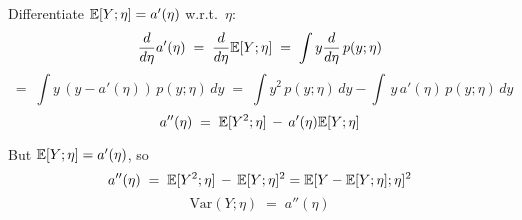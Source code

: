 \begin{answer}

Differentiate $\mathbb{E}[Y;\eta]=a'(\eta)$ w.r.t.\ $\eta$:
\[
\frac{d}{d\eta}a'(\eta)
    \;=\; \frac{d}{d\eta}\mathbb{E}[Y;\eta]
    \;=\; \int y \frac{d}{d\eta} \, p(y;\eta)
\]
\[
    \;=\; \int y\,(y - a'(\eta))\,p(y;\eta)\,dy
    \;=\; \int y^2\,p(y;\eta)\,dy - \int \,y\,a'(\eta)\,p(y;\eta)\,dy\,
\]
\[
   a''(\eta) \;=\; \mathbb{E}[Y^2;\eta] \,-\, a'(\eta)\mathbb{E}[Y;\eta]
\]

But $\mathbb{E}[Y;\eta]=a'(\eta)$, so
\[
   a''(\eta) \;=\; \mathbb{E}[Y^2;\eta] \,-\, \mathbb{E}[Y;\eta]^2 = \mathbb{E}[Y - \mathbb{E}[{Y;\eta];\eta}]^2
\]
\[
\boxed{\,\text{Var}(Y;\eta) \;=\; a''(\eta)\,}
\]

\end{answer}
